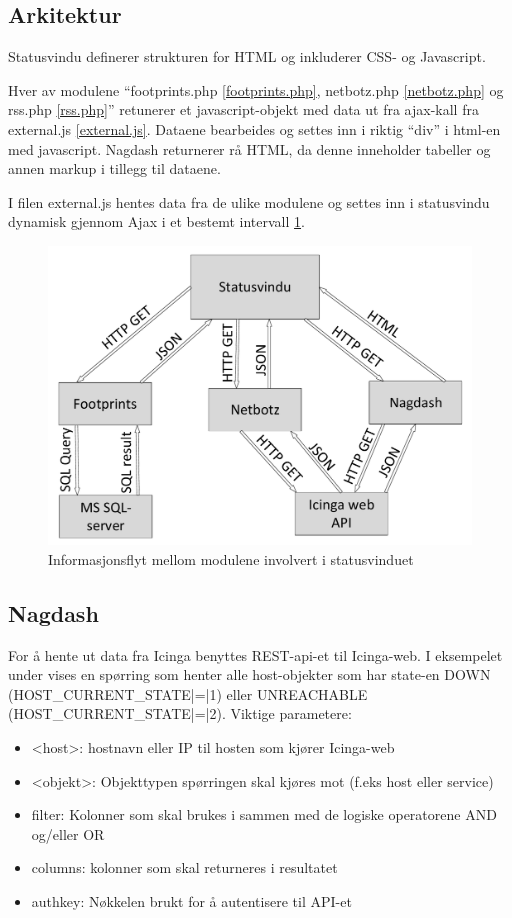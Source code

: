 \subsection{Arkitektur}

Statusvindu definerer strukturen for HTML og inkluderer CSS- og Javascript.

Hver av modulene “footprints.php \ref{footprints.php}, netbotz.php \ref{netbotz.php} og rss.php \ref{rss.php}” retunerer et javascript-objekt med data ut fra ajax-kall fra external.js \ref{external.js}. Dataene bearbeides og settes inn i riktig “div” i html-en med javascript. Nagdash returnerer rå HTML, da denne inneholder tabeller og annen markup i tillegg til dataene.

I filen external.js hentes data fra de ulike modulene og settes inn i statusvindu dynamisk gjennom Ajax i et bestemt intervall \ref{statusvindu_arkitektur}.

\begin{figure}[H]
    \centering
    \includegraphics[scale=0.4]{img/statusvindu_arkitektur}
    \caption{Informasjonsflyt mellom modulene involvert i statusvinduet}
    \label{statusvindu_arkitektur}
\end{figure}


\subsection{Nagdash}

For å hente ut data fra Icinga benyttes REST-api-et til Icinga-web. I eksempelet under vises en spørring som henter alle host-objekter som har state-en DOWN (HOST\_CURRENT\_STATE|=|1) eller UNREACHABLE (HOST\_CURRENT\_STATE|=|2). Viktige parametere:
\begin{itemize}
	\item <host>: hostnavn eller IP til hosten som kjører Icinga-web
	\item <objekt>: Objekttypen spørringen skal kjøres mot (f.eks host eller service)
	\item filter: Kolonner som skal brukes i sammen med de logiske operatorene AND og/eller OR
	\item columns: kolonner som skal returneres i resultatet
	\item authkey: Nøkkelen brukt for å autentisere til API-et
\end{itemize}

